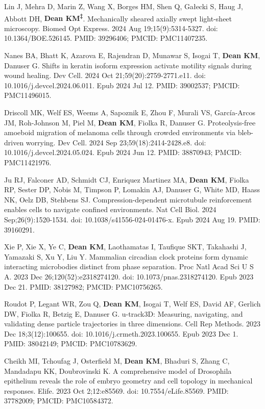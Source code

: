 \begin{etaremune}
\item Lin J, Mehra D, Marin Z, Wang X, Borges HM, Shen Q, Gałecki S, Haug J, Abbott DH, \textbf{Dean KM\textsuperscript{‡}}. Mechanically sheared axially swept light-sheet microscopy. Biomed Opt Express. 2024 Aug 19;15(9):5314-5327. doi: 10.1364/BOE.526145. PMID: 39296406; PMCID: PMC11407235.

\item Nanes BA, Bhatt K, Azarova E, Rajendran D, Munawar S, Isogai T, \textbf{Dean KM}, Danuser G. Shifts in keratin isoform expression activate motility signals during wound healing. Dev Cell. 2024 Oct 21;59(20):2759-2771.e11. doi: 10.1016/j.devcel.2024.06.011. Epub 2024 Jul 12. PMID: 39002537; PMCID: PMC11496015.

\item Driscoll MK, Welf ES, Weems A, Sapoznik E, Zhou F, Murali VS, García-Arcos JM, Roh-Johnson M, Piel M, \textbf{Dean KM}, Fiolka R, Danuser G. Proteolysis-free amoeboid migration of melanoma cells through crowded environments via bleb-driven worrying. Dev Cell. 2024 Sep 23;59(18):2414-2428.e8. doi: 10.1016/j.devcel.2024.05.024. Epub 2024 Jun 12. PMID: 38870943; PMCID: PMC11421976.

\item Ju RJ, Falconer AD, Schmidt CJ, Enriquez Martinez MA, \textbf{Dean KM}, Fiolka RP, Sester DP, Nobis M, Timpson P, Lomakin AJ, Danuser G, White MD, Haass NK, Oelz DB, Stehbens SJ. Compression-dependent microtubule reinforcement enables cells to navigate confined environments. Nat Cell Biol. 2024 Sep;26(9):1520-1534. doi: 10.1038/s41556-024-01476-x. Epub 2024 Aug 19. PMID: 39160291.

\item Xie P, Xie X, Ye C, \textbf{Dean KM}, Laothamatas I, Taufique SKT, Takahashi J, Yamazaki S, Xu Y, Liu Y. Mammalian circadian clock proteins form dynamic interacting microbodies distinct from phase separation. Proc Natl Acad Sci U S A. 2023 Dec 26;120(52):e2318274120. doi: 10.1073/pnas.2318274120. Epub 2023 Dec 21. PMID: 38127982; PMCID: PMC10756265.

\item Roudot P, Legant WR, Zou Q, \textbf{Dean KM}, Isogai T, Welf ES, David AF, Gerlich DW, Fiolka R, Betzig E, Danuser G. u-track3D: Measuring, navigating, and validating dense particle trajectories in three dimensions. Cell Rep Methods. 2023 Dec 18;3(12):100655. doi: 10.1016/j.crmeth.2023.100655. Epub 2023 Dec 1. PMID: 38042149; PMCID: PMC10783629.

\item Cheikh MI, Tchoufag J, Osterfield M, \textbf{Dean KM}, Bhaduri S, Zhang C, Mandadapu KK, Doubrovinski K. A comprehensive model of Drosophila epithelium reveals the role of embryo geometry and cell topology in mechanical responses. Elife. 2023 Oct 2;12:e85569. doi: 10.7554/eLife.85569. PMID: 37782009; PMCID: PMC10584372.


\end{etaremune}
